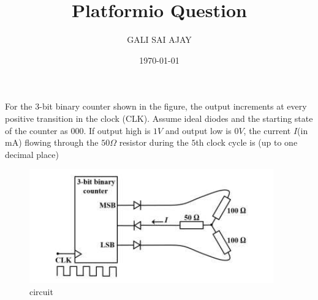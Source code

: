 \documentclass{article}
\title{Platformio Question}
\author{GALI SAI AJAY}
\date{\today}
\begin{document}
\maketitle

 For the $3$-bit binary counter shown in the figure, the output increments at every positive 
transition in the clock (CLK). Assume ideal diodes and the starting state of the counter as 
$000$. If output high is $1 V$ and output low is $0 V$, the current $I$(in mA) flowing through the 
$50 \Omega$ resistor during the $5$th clock cycle is (up to one decimal place)
\begin{figure}[H]
\centering
\includegraphics[width=\columnwidth]{pic.png}
\caption{circuit}
\label{fig:lcd}
\end{figure}
\end{document}
